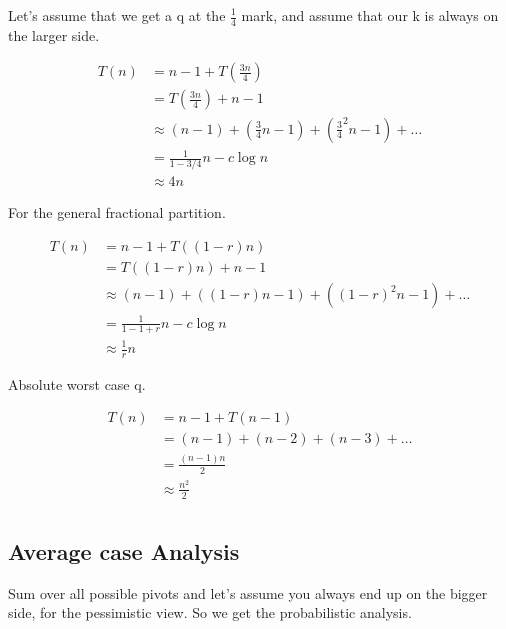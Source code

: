 \documentclass[english, 10pt]{article}
\begin{document}
Let's assume that we get a q at the $\frac{1}{4}$ mark, and assume that our k is always on the larger side.

\begin{align*}
    T(n) &= n -1 + T(\frac{3n}{4}) \\
    &= T(\frac{3n}{4}) + n -1 \\
    &\approx (n-1) + (\frac{3}{4}n-1) + ({\frac{3}{4}^2}n-1) + \ldots \\
    &= \frac{1}{1-3/4}n -c\log n \\
    &\approx 4n
\end{align*}

For the general fractional partition.

\begin{align*}
    T(n) &= n -1 + T((1-r)n) \\
    &= T((1-r)n) + n -1 \\
    &\approx (n-1) + ( (1-r)n-1) + ({(1-r)}^2n-1) + \ldots \\
    &= \frac{1}{1-1+r}n -c\log n \\
    &\approx \frac{1}{r}n
\end{align*}

Absolute worst case q.

\begin{align*}
    T(n) &= n-1 + T(n-1) \\
    &= (n-1) + (n-2) + (n-3) + \ldots \\
    &= \frac{(n-1)n}{2} \\
    &\approx \frac{n^2}{2} \\
\end{align*}


\subsection{Average case Analysis}

Sum over all possible pivots and let's assume you always end up on the bigger
side, for the pessimistic view. So we get the probabilistic analysis.
\end{document}
